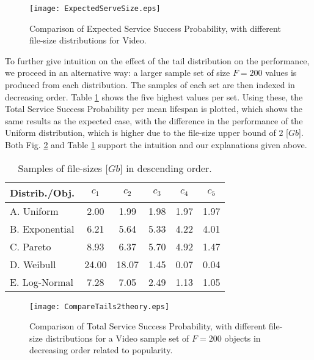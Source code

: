 \documentclass[conference]{IEEEtran}
\begin{document}
\begin{figure}[ht!]
\centering
\texttt{[image: ExpectedServeSize.eps]}
\caption{Comparison of Expected Service Success Probability, with different file-size distributions 
for Video.}
\label{fig:Expdistvar}
\end{figure}

\vspace{+0.5cm}
To further give intuition on the effect of the tail distribution on the performance, we proceed in an alternative way: a larger sample set of size $F=200$ values is produced from each distribution. The samples of each set are then indexed in decreasing order. Table \ref{Tab3} shows the five highest values per set. Using these, the Total Service Success Probability per mean lifespan is plotted, which shows the same results as the expected case, with the difference in the performance of the Uniform distribution, which is higher due to the file-size upper bound of $2$ [$Gb$]. Both Fig. \ref{fig:Vardec} and Table \ref{Tab3} support the intuition and our explanations given above. 











\begin{table}[ht!]
\normalsize
\caption{Samples of file-sizes [$Gb$] in descending order.}
\vspace{+0.5cm}
 \centering
\begin{tabular}{|l|c|c|c|c|c|}
 \hline
Distrib./Obj. & $c_1$ & $c_2$& $c_3$& $c_4$& $c_5$ \\ [1 ex]
 \hline
A. Uniform & 2.00 & 1.99 & 1.98 & 1.97 & 1.97 \\ [0.5 ex]
 \hline
B. Exponential & 6.21 & 5.64 & 5.33 & 4.22 & 4.01 \\ [0.5 ex]
\hline
C. Pareto & 8.93 & 6.37 & 5.70 & 4.92 & 1.47  \\ [0.5 ex]
\hline
D. Weibull & 24.00 & 18.07 & 1.45 & 0.07 & 0.04  \\ [0.5 ex]
\hline
E. Log-Normal & 7.28 & 7.05 & 2.49 & 1.13 & 1.05  \\ [0.5 ex]
\hline
\end{tabular}
\label{Tab3}
\end{table}



\begin{figure}[ht!]
\centering
\texttt{[image: CompareTails2theory.eps]}
\caption{Comparison of Total Service Success Probability, with different file-size distributions for a Video sample set of $F=200$ objects in decreasing order related to popularity.}
\label{fig:Vardec}
\end{figure}
\end{document}
